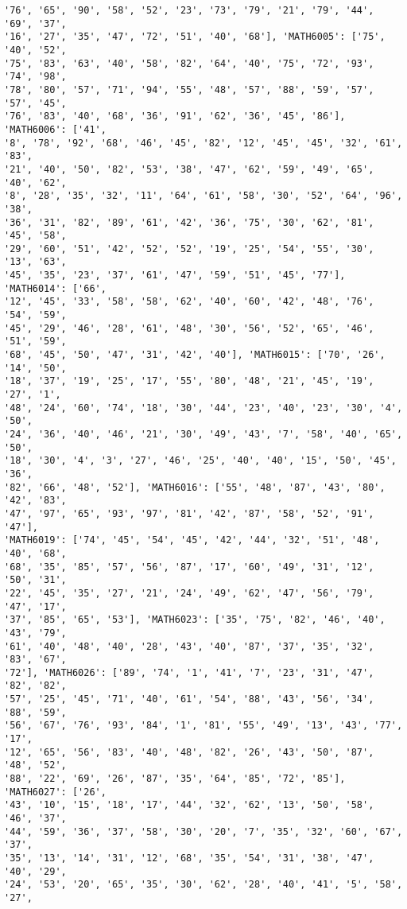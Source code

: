 \documentclass[11pt]{article}
\begin{document}
\begin{Verbatim}[commandchars=\\\{\}]
'76', '65', '90', '58', '52', '23', '73', '79', '21', '79', '44', '69', '37',
'16', '27', '35', '47', '72', '51', '40', '68'], 'MATH6005': ['75', '40', '52',
'75', '83', '63', '40', '58', '82', '64', '40', '75', '72', '93', '74', '98',
'78', '80', '57', '71', '94', '55', '48', '57', '88', '59', '57', '57', '45',
'76', '83', '40', '68', '36', '91', '62', '36', '45', '86'], 'MATH6006': ['41',
'8', '78', '92', '68', '46', '45', '82', '12', '45', '45', '32', '61', '83',
'21', '40', '50', '82', '53', '38', '47', '62', '59', '49', '65', '40', '62',
'8', '28', '35', '32', '11', '64', '61', '58', '30', '52', '64', '96', '38',
'36', '31', '82', '89', '61', '42', '36', '75', '30', '62', '81', '45', '58',
'29', '60', '51', '42', '52', '52', '19', '25', '54', '55', '30', '13', '63',
'45', '35', '23', '37', '61', '47', '59', '51', '45', '77'], 'MATH6014': ['66',
'12', '45', '33', '58', '58', '62', '40', '60', '42', '48', '76', '54', '59',
'45', '29', '46', '28', '61', '48', '30', '56', '52', '65', '46', '51', '59',
'68', '45', '50', '47', '31', '42', '40'], 'MATH6015': ['70', '26', '14', '50',
'18', '37', '19', '25', '17', '55', '80', '48', '21', '45', '19', '27', '1',
'48', '24', '60', '74', '18', '30', '44', '23', '40', '23', '30', '4', '50',
'24', '36', '40', '46', '21', '30', '49', '43', '7', '58', '40', '65', '50',
'18', '30', '4', '3', '27', '46', '25', '40', '40', '15', '50', '45', '36',
'82', '66', '48', '52'], 'MATH6016': ['55', '48', '87', '43', '80', '42', '83',
'47', '97', '65', '93', '97', '81', '42', '87', '58', '52', '91', '47'],
'MATH6019': ['74', '45', '54', '45', '42', '44', '32', '51', '48', '40', '68',
'68', '35', '85', '57', '56', '87', '17', '60', '49', '31', '12', '50', '31',
'22', '45', '35', '27', '21', '24', '49', '62', '47', '56', '79', '47', '17',
'37', '85', '65', '53'], 'MATH6023': ['35', '75', '82', '46', '40', '43', '79',
'61', '40', '48', '40', '28', '43', '40', '87', '37', '35', '32', '83', '67',
'72'], 'MATH6026': ['89', '74', '1', '41', '7', '23', '31', '47', '82', '82',
'57', '25', '45', '71', '40', '61', '54', '88', '43', '56', '34', '88', '59',
'56', '67', '76', '93', '84', '1', '81', '55', '49', '13', '43', '77', '17',
'12', '65', '56', '83', '40', '48', '82', '26', '43', '50', '87', '48', '52',
'88', '22', '69', '26', '87', '35', '64', '85', '72', '85'], 'MATH6027': ['26',
'43', '10', '15', '18', '17', '44', '32', '62', '13', '50', '58', '46', '37',
'44', '59', '36', '37', '58', '30', '20', '7', '35', '32', '60', '67', '37',
'35', '13', '14', '31', '12', '68', '35', '54', '31', '38', '47', '40', '29',
'24', '53', '20', '65', '35', '30', '62', '28', '40', '41', '5', '58', '27',

\end{Verbatim}
\end{document}
